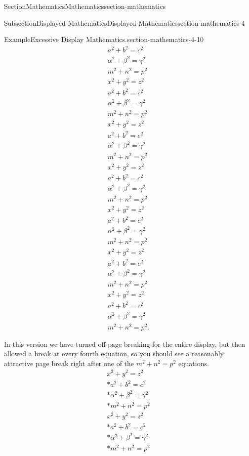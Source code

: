 \documentclass[twoside,10pt,]{article}
\numberwithin{equation}{section}
\begin{document}
\begin{sectionptx}{Section}{Mathematics}{}{Mathematics}{}{}{section-mathematics}
\begin{subsectionptx}{Subsection}{Displayed Mathematics}{}{Displayed Mathematics}{}{}{section-mathematics-4}
\begin{example}{Example}{Excessive Display Mathematics.}{section-mathematics-4-10}
\begin{gather*}
a^2+b^2=c^2\\
\alpha^2+\beta^2=\gamma^2\\
m^2+n^2=p^2\\
x^2+y^2=z^2\\
a^2+b^2=c^2\\
\alpha^2+\beta^2=\gamma^2\\
m^2+n^2=p^2\\
x^2+y^2=z^2\\
a^2+b^2=c^2\\
\alpha^2+\beta^2=\gamma^2\\
m^2+n^2=p^2\\
x^2+y^2=z^2\\
a^2+b^2=c^2\\
\alpha^2+\beta^2=\gamma^2\\
m^2+n^2=p^2\\
x^2+y^2=z^2\\
a^2+b^2=c^2\\
\alpha^2+\beta^2=\gamma^2\\
m^2+n^2=p^2\\
x^2+y^2=z^2\\
a^2+b^2=c^2\\
\alpha^2+\beta^2=\gamma^2\\
m^2+n^2=p^2\\
x^2+y^2=z^2\\
a^2+b^2=c^2\\
\alpha^2+\beta^2=\gamma^2\\
m^2+n^2=p^2\text{.}
\end{gather*}
%
\par
In this version we have turned off page breaking for the entire display, but then allowed a break at every fourth equation, so you should see a reasonably attractive page break right after one of the \(m^2+n^2=p^2\) equations.%
\begin{gather}
x^2+y^2=z^2\label{section-mathematics-4-10-3-2-1}\\*
a^2+b^2=c^2\label{section-mathematics-4-10-3-2-2}\\*
\alpha^2+\beta^2=\gamma^2\label{section-mathematics-4-10-3-2-3}\\*
m^2+n^2=p^2\label{section-mathematics-4-10-3-2-4}\\
x^2+y^2=z^2\label{section-mathematics-4-10-3-2-5}\\*
a^2+b^2=c^2\label{section-mathematics-4-10-3-2-6}\\*
\alpha^2+\beta^2=\gamma^2\label{section-mathematics-4-10-3-2-7}\\*
m^2+n^2=p^2\label{section-mathematics-4-10-3-2-8}\\

\end{gather}
\end{example}
\end{subsectionptx}
\end{sectionptx}
\end{document}
